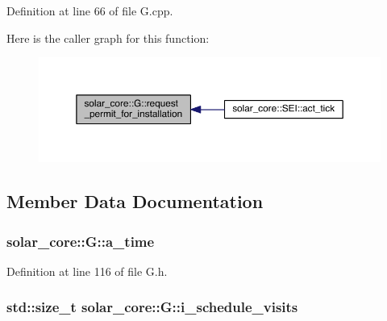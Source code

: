 Definition at line 66 of file G.\+cpp.



Here is the caller graph for this function\+:
\nopagebreak
\begin{figure}[H]
\begin{center}
\leavevmode
\includegraphics[width=350pt]{classsolar__core_1_1_g_a615600f35d73a38ea48e99909fff5085_icgraph}
\end{center}
\end{figure}




\subsection{Member Data Documentation}
\hypertarget{classsolar__core_1_1_g_a4d5b2845fc790c0f14b13fe922821f4b}{}
\subsubsection[{a\+\_\+time}]{ solar\+\_\+core\+::\+G\+::a\+\_\+time\hspace{0.3cm}{\ttfamily [protected]}}\label{classsolar__core_1_1_g_a4d5b2845fc790c0f14b13fe922821f4b}


Definition at line 116 of file G.\+h.

\hypertarget{classsolar__core_1_1_g_a5c79440fcadc7d3e9212c5e7c05f84f7}{}
\subsubsection[{i\+\_\+schedule\+\_\+visits}]{\setlength{\rightskip}{0pt plus 5cm}std\+::size\+\_\+t solar\+\_\+core\+::\+G\+::i\+\_\+schedule\+\_\+visits\hspace{0.3cm}{\ttfamily [protected]}}\label{classsolar__core_1_1_g_a5c79440fcadc7d3e9212c5e7c05f84f7}


